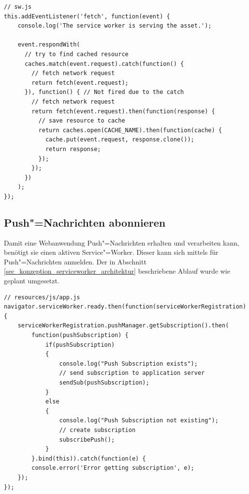 \begin{lstlisting}[caption={Verarbeitung empfangener Requests und Auswertung möglicher Responses im Service Worker},label={lst_realisierung_sw-caching}, frame=single]
// sw.js
this.addEventListener('fetch', function(event) {
    console.log('The service worker is serving the asset.');

    event.respondWith(
      // try to find cached resource
      caches.match(event.request).catch(function() {
        // fetch network request
        return fetch(event.request);
      }), function() { // Not fired due to the catch
        // fetch network request
        return fetch(event.request).then(function(response) {
          // save resource to cache
          return caches.open(CACHE_NAME).then(function(cache) {
            cache.put(event.request, response.clone());
            return response;
          });  
        });
      })
    );
});
\end{lstlisting}

\newpage
\subsection{Push"=Nachrichten abonnieren}

Damit eine Webanwendung Push"=Nachrichten erhalten und verarbeiten kann, benötigt sie einen aktiven Service"=Worker. Dieser kann sich mittels  für Push"=Nachrichten anmelden. Der in Abschnitt \ref{sec_konzeption_serviceworker_architektur} beschriebene Ablauf wurde wie geplant umgesetzt. \\

\begin{lstlisting}[caption={Service Worker: Anmeldung am Push"=Server},label={lst_realisierung_sw-push-subscribe}, frame=single]
// resources/js/app.js
navigator.serviceWorker.ready.then(function(serviceWorkerRegistration) {
    serviceWorkerRegistration.pushManager.getSubscription().then(
        function(pushSubscription) {
            if(pushSubscription)
            {
                console.log("Push Subscription exists");
                // send subscription to application server
                sendSub(pushSubscription);
            }
            else
            {
                console.log("Push Subscription not existing");
                // create subscription
                subscribePush();
            }
        }.bind(this)).catch(function(e) {
        console.error('Error getting subscription', e);
    });
});
\end{lstlisting}

